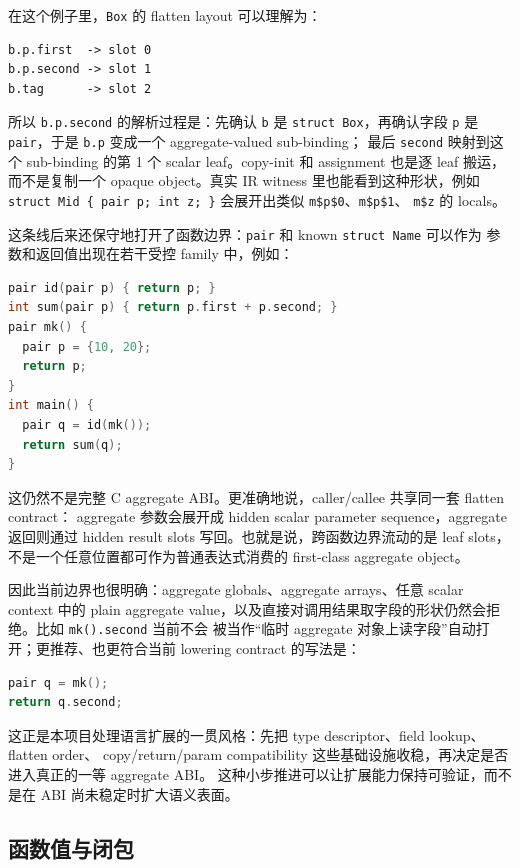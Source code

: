 \documentclass[UTF8,a4paper,11pt]{ctexart}
\begin{document}
在这个例子里，\texttt{Box} 的 flatten layout 可以理解为：

\begin{lstlisting}[language={}]
b.p.first  -> slot 0
b.p.second -> slot 1
b.tag      -> slot 2
\end{lstlisting}

所以 \texttt{b.p.second} 的解析过程是：先确认 \texttt{b} 是 \texttt{struct Box}，再确认字段
\texttt{p} 是 \texttt{pair}，于是 \texttt{b.p} 变成一个 aggregate-valued sub-binding；
最后 \texttt{second} 映射到这个 sub-binding 的第 1 个 scalar leaf。copy-init 和 assignment
也是逐 leaf 搬运，而不是复制一个 opaque object。真实 IR witness 里也能看到这种形状，例如
\texttt{struct Mid \{ pair p; int z; \}} 会展开出类似 \texttt{m\$p\$0}、\texttt{m\$p\$1}、
\texttt{m\$z} 的 locals。

这条线后来还保守地打开了函数边界：\texttt{pair} 和 known \texttt{struct Name} 可以作为
参数和返回值出现在若干受控 family 中，例如：

\begin{lstlisting}[language=C]
pair id(pair p) { return p; }
int sum(pair p) { return p.first + p.second; }
pair mk() {
  pair p = {10, 20};
  return p;
}
int main() {
  pair q = id(mk());
  return sum(q);
}
\end{lstlisting}

这仍然不是完整 C aggregate ABI。更准确地说，caller/callee 共享同一套 flatten contract：
aggregate 参数会展开成 hidden scalar parameter sequence，aggregate 返回则通过 hidden result
slots 写回。也就是说，跨函数边界流动的是 leaf slots，不是一个任意位置都可作为普通表达式消费的
first-class aggregate object。

因此当前边界也很明确：aggregate globals、aggregate arrays、任意 scalar context 中的 plain
aggregate value，以及直接对调用结果取字段的形状仍然会拒绝。比如 \texttt{mk().second} 当前不会
被当作“临时 aggregate 对象上读字段”自动打开；更推荐、也更符合当前 lowering contract 的写法是：

\begin{lstlisting}[language=C]
pair q = mk();
return q.second;
\end{lstlisting}

这正是本项目处理语言扩展的一贯风格：先把 type descriptor、field lookup、flatten order、
copy/return/param compatibility 这些基础设施收稳，再决定是否进入真正的一等 aggregate ABI。
这种小步推进可以让扩展能力保持可验证，而不是在 ABI 尚未稳定时扩大语义表面。

\subsection{函数值与闭包}
\end{document}

